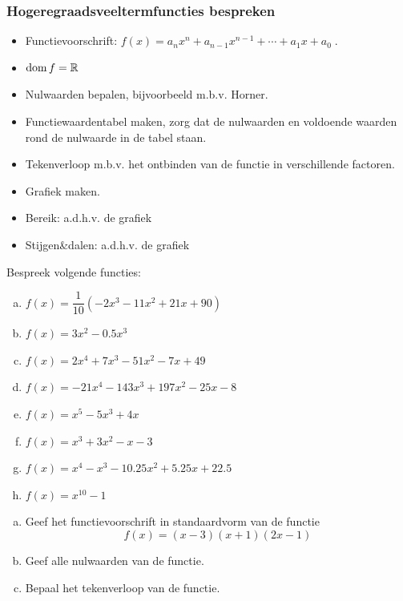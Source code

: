\documentclass[12pt,twoside,a4paper]{article}
\begin{document}
\subsubsection*{Hogeregraadsveeltermfuncties bespreken}
\begin{mdframed}
  \begin{itemize}
  \item Functievoorschrift: $f(x)= a_nx^n + a_{n-1}x^{n-1} + \cdots + a_1x + a_0\;.$
  \item $\dom f = \mathbb{R}$
  \item Nulwaarden bepalen, bijvoorbeeld m.b.v. Horner.
  \item Functiewaardentabel maken, zorg dat de nulwaarden en voldoende waarden rond de nulwaarde in de tabel staan.
  \item Tekenverloop m.b.v. het ontbinden van de functie in verschillende factoren.
  \item Grafiek maken.
  \item Bereik: a.d.h.v. de grafiek
  \item Stijgen\&dalen: a.d.h.v. de grafiek
  \end{itemize}
\end{mdframed}

\begin{oefening}
  Bespreek volgende functies:
  \begin{multicols}{2}
    \begin{enumerate}[(a)]
      \itemsep.8em
    \item $f(x)=\dfrac{1}{10}(-2x^3-11x^2+21x+90)$
    \item $f(x)=3x^2-0.5x^3$
    \item $f(x)=2x^4+7x^3-51x^2-7x+49$
    \item $f(x)=-21x^4-143x^3+197x^2-25x-8$
    \item $f(x)=x^5-5x^3+4x$
    \item $f(x)=x^3+3x^2-x-3$
    \item $f(x)=x^4-x^3-10.25x^2+5.25x+22.5$
    \item $f(x)=x^{10}-1$
    \end{enumerate}
  \end{multicols}
\end{oefening}

\begin{oefening}
\begin{enumerate}[(a)]
  \item Geef het functievoorschrift in standaardvorm van de functie
$$f(x)=(x-3)(x+1)(2x-1)$$
  \item Geef alle nulwaarden van de functie.
  \item Bepaal het tekenverloop van de functie.
\end{enumerate}
\end{oefening}
\end{document}
